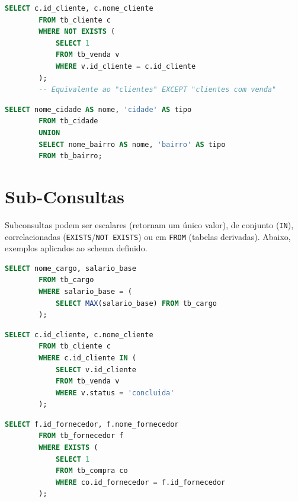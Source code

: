 \documentclass[
12pt,
a4paper,
semrecuonosumario,
sumario = abnt-6027-2012]{report}
\begin{document}
    \begin{lstlisting}[language=SQL,caption={SELECT -- EXCEPT (equivalente): clientes que nunca compraram}]
        SELECT c.id_cliente, c.nome_cliente
        FROM tb_cliente c
        WHERE NOT EXISTS (
            SELECT 1
            FROM tb_venda v
            WHERE v.id_cliente = c.id_cliente
        );
        -- Equivalente ao "clientes" EXCEPT "clientes com venda"
    \end{lstlisting}

    \begin{lstlisting}[language=SQL,caption={SELECT -- UNION: cidades e bairros (rótulo por tipo)}]
        SELECT nome_cidade AS nome, 'cidade' AS tipo
        FROM tb_cidade
        UNION
        SELECT nome_bairro AS nome, 'bairro' AS tipo
        FROM tb_bairro;
    \end{lstlisting}


        \section{Sub-Consultas}

    Subconsultas podem ser escalares (retornam um único valor), de conjunto (\texttt{IN}), correlacionadas (\texttt{EXISTS}/\texttt{NOT EXISTS}) ou em \texttt{FROM} (tabelas derivadas). Abaixo, exemplos aplicados ao schema definido.

    \begin{lstlisting}[language=SQL,caption={SELECT -- Subconsulta escalar: maior salário-base de cargo}]
        SELECT nome_cargo, salario_base
        FROM tb_cargo
        WHERE salario_base = (
            SELECT MAX(salario_base) FROM tb_cargo
        );
    \end{lstlisting}

    \begin{lstlisting}[language=SQL,caption={SELECT -- IN: clientes com ao menos uma venda concluída}]
        SELECT c.id_cliente, c.nome_cliente
        FROM tb_cliente c
        WHERE c.id_cliente IN (
            SELECT v.id_cliente
            FROM tb_venda v
            WHERE v.status = 'concluida'
        );
    \end{lstlisting}

    \begin{lstlisting}[language=SQL,caption={SELECT -- EXISTS (correlata): fornecedores que já tiveram compras}]
        SELECT f.id_fornecedor, f.nome_fornecedor
        FROM tb_fornecedor f
        WHERE EXISTS (
            SELECT 1
            FROM tb_compra co
            WHERE co.id_fornecedor = f.id_fornecedor
        );
    \end{lstlisting}
\end{document}
